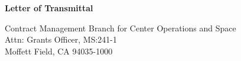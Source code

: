 
\begin{center}
{\large\bf Letter of Transmittal}

Contract Management Branch for Center Operations and Space \\
Attn: Grants Officer, MS:241-1 \\
Moffett Field, CA 94035-1000
\end{center}


